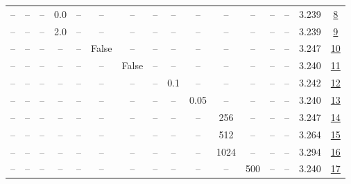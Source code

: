 \begin{table}[H]
\begin{tabular}{cccccccccccccccc}
-- & -- & -- & 0.0 & -- & -- & -- & -- & -- & -- & -- & -- & -- & -- & 3.239 & \href{https://wandb.ai/marin-community/optimizer-scaling/runs/sweep-130m-21B-krondde23clr0.001-wd0.5-b10.95-plr0.2-pis1-gn0.0--a52891}{8} \\
-- & -- & -- & 2.0 & -- & -- & -- & -- & -- & -- & -- & -- & -- & -- & 3.239 & \href{https://wandb.ai/marin-community/optimizer-scaling/runs/sweep-130m-21B-kron1ea0f5lr0.001-wd0.5-b10.95-plr0.2-pis1-gn2.0--d842fd}{9} \\
-- & -- & -- & -- & -- & False & -- & -- & -- & -- & -- & -- & -- & -- & 3.247 & \href{https://wandb.ai/marin-community/optimizer-scaling/runs/sweep-130m-21B-kron655886lr0.001-wd0.5-b10.95-plr0.2-pis1-gn1-no-9fcd23}{10} \\
-- & -- & -- & -- & -- & -- & False & -- & -- & -- & -- & -- & -- & -- & 3.240 & \href{https://wandb.ai/marin-community/optimizer-scaling/runs/sweep-130m-21B-kron3be334lr0.001-wd0.5-b10.95-plr0.2-pis1-gn1-no-189c09}{11} \\
-- & -- & -- & -- & -- & -- & -- & -- & 0.1 & -- & -- & -- & -- & -- & 3.242 & \href{https://wandb.ai/marin-community/optimizer-scaling/runs/sweep-130m-21B-kron2c06b9lr0.001-wd0.5-b10.95-plr0.1-pis1-gn1-no-156c36}{12} \\
-- & -- & -- & -- & -- & -- & -- & -- & -- & 0.05 & -- & -- & -- & -- & 3.240 & \href{https://wandb.ai/marin-community/optimizer-scaling/runs/sweep-130m-21B-kronf63620lr0.001-wd0.5-b10.95-plr0.2-pis1-gn1-no-8d37da}{13} \\
-- & -- & -- & -- & -- & -- & -- & -- & -- & -- & 256 & -- & -- & -- & 3.247 & \href{https://wandb.ai/marin-community/optimizer-scaling/runs/sweep-130m-21B-kronb99966lr0.001-wd0.5-b10.95-plr0.2-pis1-gn1-no-87a643}{14} \\
-- & -- & -- & -- & -- & -- & -- & -- & -- & -- & 512 & -- & -- & -- & 3.264 & \href{https://wandb.ai/marin-community/optimizer-scaling/runs/sweep-130m-21B-kronz798587lr0.001-wd0.5-b10.95-plr0.2-pis1-gn1-n-b546f9}{15} \\
-- & -- & -- & -- & -- & -- & -- & -- & -- & -- & 1024 & -- & -- & -- & 3.294 & \href{https://wandb.ai/marin-community/optimizer-scaling/runs/sweep-130m-21B-kron8f965elr0.001-wd0.5-b10.95-plr0.2-pis1-gn1-no-5a3434}{16} \\
-- & -- & -- & -- & -- & -- & -- & -- & -- & -- & -- & 500 & -- & -- & 3.240 & \href{https://wandb.ai/marin-community/optimizer-scaling/runs/sweep-130m-21B-krona3d4b1lr0.001-wd0.5-b10.95-plr0.2-pis1-gn1-no-734cae}{17} \\

\end{tabular}
\end{table}
